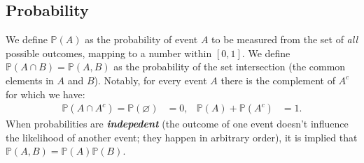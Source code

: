 \documentclass{article}
\begin{document}
\subsection{Probability}
We define $\mathbb{P}(A)$ as the probability of event $A$ to be measured from the set of \textit{all} possible outcomes, mapping to a number within $[0,1]$. We define $\mathbb{P}(A\cap B)=\mathbb{P}(A,B)$ as the probability of the set intersection (the common elements in $A$ and $B$). Notably, for every event $A$ there is the complement of $A^c$ for which we have:
\begin{align}
    \mathbb{P}(A\cap A^c)=\mathbb{P}(\varnothing)&=0,&
    \mathbb{P}(A) + \mathbb{P}(A^c)&=1.
\end{align}
When probabilities are \textit{\textbf{indepedent}} (the outcome of one event doesn't influence the likelihood of another event; they happen in arbitrary order), it is implied that $\mathbb{P}(A,B)=\mathbb{P}(A)\mathbb{P}(B)$.
\end{document}
